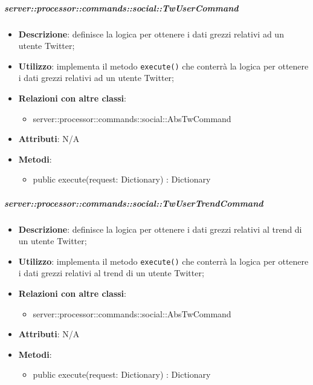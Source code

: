         \subparagraph{server::processor::commands::social::TwUserCommand} %
        \label{subp:bdsm_app_server_processor_commands_social_twusercommand}
        \begin{itemize}
          \item \textbf{Descrizione}: definisce la logica per ottenere i dati grezzi relativi ad un utente Twitter;
          \item \textbf{Utilizzo}: implementa il metodo \texttt{execute()} che conterrà la logica per ottenere i dati grezzi relativi ad un utente Twitter;
          \item \textbf{Relazioni con altre classi}:
            \begin{itemize}
              \item server::processor::commands::social::AbsTwCommand
            \end{itemize}
			\item \textbf{Attributi}: N/A
			\item \textbf{Metodi}:
        	\begin{itemize}
          		\item public execute(request: Dictionary) : Dictionary
        	\end{itemize}
        \end{itemize}

        \subparagraph{server::processor::commands::social::TwUserTrendCommand} %
        \label{subp:bdsm_app_server_processor_commands_social_twusertrendcommand}
        \begin{itemize}
          \item \textbf{Descrizione}: definisce la logica per ottenere i dati grezzi relativi al trend di un utente Twitter;
          \item \textbf{Utilizzo}: implementa il metodo \texttt{execute()} che conterrà la logica per ottenere i dati grezzi relativi al trend di un utente Twitter;
          \item \textbf{Relazioni con altre classi}:
            \begin{itemize}
              \item server::processor::commands::social::AbsTwCommand
            \end{itemize}
			\item \textbf{Attributi}: N/A
			\item \textbf{Metodi}:
        	\begin{itemize}
          		\item public execute(request: Dictionary) : Dictionary
        	\end{itemize}
        \end{itemize}

